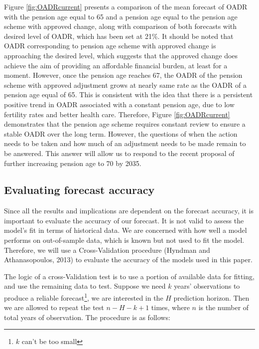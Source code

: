 \documentclass[11pt,a4paper,]{article}
\begin{document}
Figure \ref{fig:OADRcurrent} presents a comparison of the mean forecast of OADR with the pension age equal to 65 and a pension age equal to the pension age scheme with approved change, along with comparison of both forecasts with desired level of OADR, which has been set at 21\%. It should be noted that OADR corresponding to pension age scheme with approved change is approaching the desired level, which suggests that the approved change does achieve the aim of providing an affordable financial burden, at least for a moment. However, once the pension age reaches 67, the OADR of the pension scheme with approved adjustment grows at nearly same rate as the OADR of a pension age equal of 65. This is consistent with the idea that there is a persistent positive trend in OADR associated with a constant pension age, due to low fertility rates and better health care. Therefore, Figure \ref{fig:OADRcurrent} demonstrates that the pension age scheme requires constant review to ensure a stable OADR over the long term. However, the questions of when the action needs to be taken and how much of an adjustment needs to be made remain to be answered. This answer will allow us to respond to the recent proposal of further increasing pension age to 70 by 2035.

\hypertarget{sec:accuracy}{%
\subsection{Evaluating forecast accuracy}\label{sec:accuracy}}

Since all the results and implications are dependent on the forecast accuracy, it is important to evaluate the accuracy of our forecast. It is not valid to assess the model's fit in terms of historical data. We are concerned with how well a model performs on out-of-sample data, which is known but not used to fit the model. Therefore, we will use a Cross-Validation procedure (Hyndman and Athanasopoulos, 2013) to evaluate the accuracy of the models used in this paper.

The logic of a cross-Validation test is to use a portion of available data for fitting, and use the remaining data to test. Suppose we need \(k\) years' observations to produce a reliable forecast\footnote{\(k\) can't be too small}, we are interested in the \(H\) prediction horizon. Then we are allowed to repeat the test \(n-H-k+1\) times, where \(n\) is the number of total years of observation. The procedure is as follows:
\end{document}
